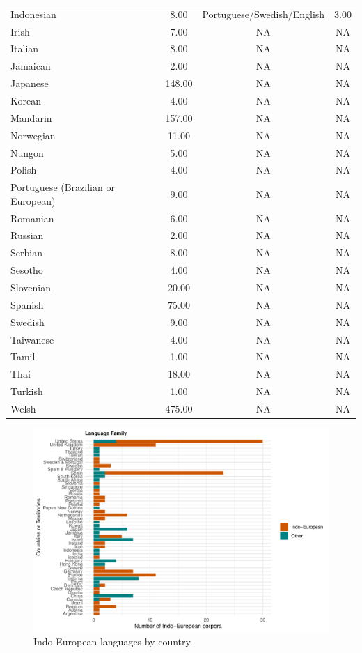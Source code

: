 \documentclass[
  man,floatsintext]{apa6}
\begin{document}
\begin{center}
\begin{ThreePartTable}
\begin{longtable}{lccc}
Indonesian & 8.00 & Portuguese/Swedish/English & 3.00\\
Irish & 7.00 & NA & NA\\
Italian & 8.00 & NA & NA\\
Jamaican & 2.00 & NA & NA\\
Japanese & 148.00 & NA & NA\\
Korean & 4.00 & NA & NA\\
Mandarin & 157.00 & NA & NA\\
Norwegian & 11.00 & NA & NA\\
Nungon & 5.00 & NA & NA\\
Polish & 4.00 & NA & NA\\
Portuguese (Brazilian or European) & 9.00 & NA & NA\\
Romanian & 6.00 & NA & NA\\
Russian & 2.00 & NA & NA\\
Serbian & 8.00 & NA & NA\\
Sesotho & 4.00 & NA & NA\\
Slovenian & 20.00 & NA & NA\\
Spanish & 75.00 & NA & NA\\
Swedish & 9.00 & NA & NA\\
Taiwanese & 4.00 & NA & NA\\
Tamil & 1.00 & NA & NA\\
Thai & 18.00 & NA & NA\\
Turkish & 1.00 & NA & NA\\
Welsh & 475.00 & NA & NA\\
\bottomrule
\end{longtable}

\end{ThreePartTable}
\end{center}

\begin{figure}
\centering
\includegraphics{CHILDES_short_files/figure-latex/figure7-1.pdf}
\caption{\label{fig:figure7}Indo-European languages by country.}
\end{figure}
\end{document}
